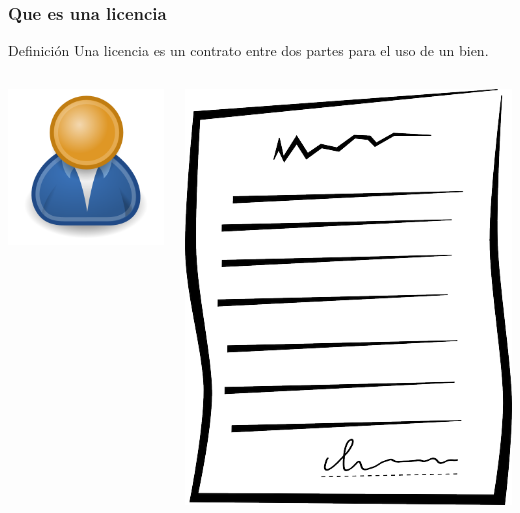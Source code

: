\documentclass[11pt]{beamer}
\begin{document}
\begin{frame}
\frametitle{Que es una licencia}
\begin{block}{Definición}
Una licencia es un contrato entre dos partes para el uso de un bien.
\end{block}

\begin{columns}

\begin{center}
\includegraphics[scale=0.3]{images/User1_icon.png}
\end{center}

\begin{center}
\includegraphics[scale=0.1]{images/document.png}
\end{center}


\end{columns}
\end{frame}
\end{document}
